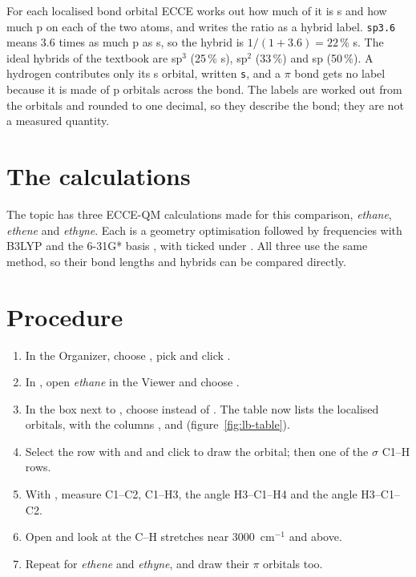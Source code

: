 For each localised bond orbital ECCE works out how much of it is s and how much p on each of the two atoms, and writes the ratio as a hybrid label. \texttt{sp3.6} means 3.6 times as much p as s, so the hybrid is $1/(1+3.6) = 22\,\%$ s. The ideal hybrids of the textbook are sp$^3$ (25\,\% s), sp$^2$ (33\,\%) and sp (50\,\%). A hydrogen contributes only its s orbital, written \texttt{s}, and a $\pi$ bond gets no label because it is made of p orbitals across the bond. The labels are worked out from the orbitals and rounded to one decimal, so they describe the bond; they are not a measured quantity.

\section{The calculations}
The topic  has three ECCE-QM calculations made for this comparison, \emph{ethane}, \emph{ethene} and \emph{ethyne}. Each is a geometry optimisation followed by frequencies with B3LYP \cite{becke1993} and the 6-31G* basis \cite{hariharan1973}, with  ticked under . All three use the same method, so their bond lengths and hybrids can be compared directly.

\section{Procedure}
\begin{enumerate}
	\item In the Organizer, choose , pick  and click .
	\item In , open \emph{ethane} in the Viewer and choose .
	\item In the box next to , choose  instead of . The table now lists the localised orbitals, with the columns ,  and  (figure~\ref{fig:lb-table}).
	\item Select the row with \menu{$\sigma$} and  and click  to draw the orbital; then one of the $\sigma$ C1--H rows.
	\item With , measure C1--C2, C1--H3, the angle H3--C1--H4 and the angle H3--C1--C2.
	\item Open  and look at the C--H stretches near 3000~cm$^{-1}$ and above.
	\item Repeat for \emph{ethene} and \emph{ethyne}, and draw their $\pi$ orbitals too.
\end{enumerate}

